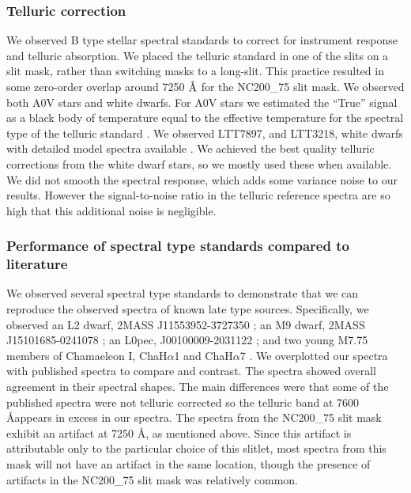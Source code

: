 \documentclass[12pt,preprint]{aastex}
\newcommand{\angstrom}{\mbox{\normalfont\AA}}
\begin{document}
\subsubsection{Telluric correction}
We observed B type stellar spectral standards to correct for instrument response and telluric absorption.  We placed the telluric standard in one of the slits on a slit mask, rather than switching masks to a long-slit.  This practice resulted in some zero-order overlap around 7250 $\angstrom$ for the NC200\_75 slit mask.  We observed both A0V stars and white dwarfs.  For A0V stars we estimated the ``True'' signal as a black body of temperature equal to the effective temperature for the spectral type of the telluric standard \citep{2000asqu.book.....C}.  We observed LTT7897, and LTT3218, white dwarfs with detailed model spectra available \citep{2014A&A...568A...9M}.  We achieved the best quality telluric corrections from the white dwarf stars, so we mostly used these when available.  We did not smooth the spectral response, which adds some variance noise to our results.  However the signal-to-noise ratio in the telluric reference spectra are so high that this additional noise is negligible.

\subsubsection{Performance of spectral type standards compared to literature}
We observed several spectral type standards to demonstrate that we can reproduce the observed spectra of known late type sources.  Specifically, we observed an L2 dwarf, 2MASS J11553952-3727350 \citep{2008AJ....136.1290R}; an M9 dwarf, 2MASS J15101685-0241078 \citep{2008AJ....136.1290R}; an L0pec, J00100009-2031122 \citep{2007AJ....133..439C}; and two young M7.75 members of Chamaeleon I, ChaH$\alpha$1 and ChaH$\alpha$7 \citep{2004ApJ...602..816L}.  We overplotted our spectra with published spectra to compare and contrast.  The spectra showed overall agreement in their spectral shapes.  The main differences were that some of the published spectra were not telluric corrected so the telluric band at 7600 \angstrom appears in excess in our spectra.  The spectra from the NC200\_75 slit mask exhibit an artifact at 7250 \angstrom, as mentioned above.  Since this artifact is attributable only to the particular choice of this slitlet, most spectra from this mask will not have an artifact in the same location, though the presence of artifacts in the NC200\_75 slit mask was relatively common.
\end{document}
